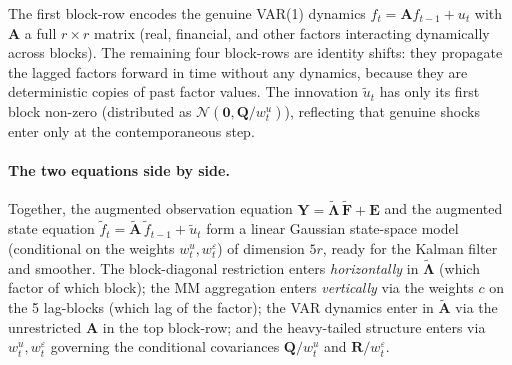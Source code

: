 \documentclass[11pt, a4paper, oneside]{article}
\newcommand{\mL}{\boldsymbol{\Lambda}}
\newcommand{\mA}{\mathbf{A}}
\newcommand{\mR}{\mathbf{R}}
\newcommand{\mQ}{\mathbf{Q}}
\begin{document}
The first block-row encodes the genuine VAR(1) dynamics
$f_t = \mA f_{t-1} + u_t$ with $\mA$ a full $r \times r$ matrix
(real, financial, and other factors interacting dynamically across
blocks). The remaining four block-rows are identity shifts: they
propagate the lagged factors forward in time without any dynamics,
because they are deterministic copies of past factor values. The
innovation $\tilde{u}_t$ has only its first block non-zero
(distributed as $\mathcal{N}(\mathbf{0}, \mQ/w^u_t)$), reflecting
that genuine shocks enter only at the contemporaneous step.

\paragraph{The two equations side by side.}
Together, the augmented observation equation
$\mathbf{Y} = \tilde{\mL}\,\tilde{\mathbf{F}} + \mathbf{E}$ and the
augmented state equation $\tilde{f}_t = \tilde{\mA}\,\tilde{f}_{t-1} + \tilde{u}_t$
form a linear Gaussian state-space model (conditional on the weights
$w^u_t, w^\varepsilon_t$) of dimension $5r$, ready for the Kalman
filter and smoother. The block-diagonal restriction enters
\emph{horizontally} in $\tilde{\mL}$ (which factor of which block);
the MM aggregation enters \emph{vertically} via the weights $c$ on
the 5 lag-blocks (which lag of the factor); the VAR dynamics enter
in $\tilde{\mA}$ via the unrestricted $\mA$ in the top block-row;
and the heavy-tailed structure enters via $w^u_t, w^\varepsilon_t$
governing the conditional covariances $\mQ/w^u_t$ and $\mR/w^\varepsilon_t$.
\end{document}
